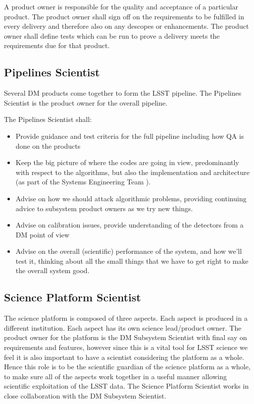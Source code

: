 A product owner is responsible for the quality and acceptance of a particular product.
The product owner shall sign off on the requirements to be fulfilled in every delivery and therefore also on any descopes or enhancements.
The product owner shall define tests which can be run to prove a delivery meets the requirements due for that product.

\subsection{Pipelines Scientist \label{role:pipe}}

Several DM products come together to form the LSST pipeline. The Pipelines Scientist is the product owner for the overall pipeline.

The Pipelines Scientist shall:

\begin{itemize}

\item Provide guidance and test criteria for the full pipeline including how QA is done on the products
\item Keep the big picture of where the codes are going in view, predominantly with respect to the algorithms, but also the implementation and architecture (as part of the Systems Engineering Team ).
\item Advise on how we should attack algorithmic problems, providing continuing advice to subsystem product owners as we try new things.
\item Advise on calibration issues, provide understanding of the detectors from a DM point of view
\item Advise on the overall (scientific) performance of the system, and how we'll test it, thinking about all the small things that we have to get right to make the overall system good.

\end{itemize}

\subsection{Science Platform Scientist \label{role:scip}}
The science platform is composed of three aspects. Each aspect is produced in a different institution.
Each aspect has its own science lead/product owner.
The product owner for the platform is the DM Subsystem Scientist  with final say on requirements and features, however since this is a vital tool for LSST science we feel it is also important to have a scientist considering the platform as a whole.
Hence this role is to be the scientific guardian of the science platform as a whole, to make sure all of the aspects work together in a useful manner allowing scientific exploitation of the LSST data. The Science Platform Scientist works in close collaboration with the DM Subsystem Scientist.

